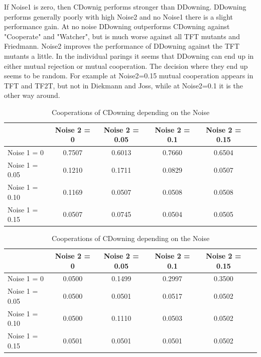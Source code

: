 If Noise1 is zero, then CDownig performs stronger than DDowning. DDowning performs generally poorly with high Noise2 and no Noise1 there is a slight performance gain. At no noise DDowning outperforms CDowning against "Cooperate" and "Watcher", but is much worse against all TFT mutants and Friedmann. Noise2 improves the performance of DDowning against the TFT mutants a little. In the individual parings it seems that DDowning can end up in either mutual rejection or mutual cooperation. The decision where they end up seems to be random. For example at Noise2=0.15 mutual cooperation appears in TFT and TF2T, but not in Diekmann and Joss, while at Noise2=0.1 it is the other way around.

\begin{table}[h]
 \begin{center}
\caption{Cooperations of CDowning depending on the Noise} \vspace{3mm}
\begin{tabular}{|l|c|c|c|c|c|}
\hline
   	& Noise 2 = 0 & Noise 2 = 0.05& Noise 2 = 0.1& Noise 2 = 0.15 \\
  \hline
  Noise 1 = 0 	&      0.7507  &  0.6013 &   0.7660 &  0.6504 \\
 \hline
  Noise 1 = 0.05	 &           0.1210  &  0.1711  &  0.0829 &  0.0507 \\
 \hline
  Noise 1 = 0.10 	&          0.1169   & 0.0507 &   0.0508  &  0.0508 \\
 \hline
  Noise 1 = 0.15 	&        0.0507  &  0.0745 &   0.0504 &  0.0505 \\
 \hline
\end{tabular}
 \end{center}
\end{table}

\begin{table}[h]
 \begin{center}
\caption{Cooperations of CDowning depending on the Noise} \vspace{3mm}
\begin{tabular}{|l|c|c|c|c|c|}
\hline
   	& Noise 2 = 0 & Noise 2 = 0.05& Noise 2 = 0.1& Noise 2 = 0.15 \\
  \hline
  Noise 1 = 0 	&        0.0500  &  0.1499&   0.2997  &  0.3500 \\
 \hline
  Noise 1 = 0.05	 &              0.0500   & 0.0501  &  0.0517  & 0.0502 \\
 \hline
  Noise 1 = 0.10 	&             0.0500 &   0.1110  &  0.0503  &  0.0502 \\
 \hline
  Noise 1 = 0.15 	&          0.0501  &  0.0501 &   0.0501  &  0.0502 \\
 \hline
\end{tabular}
 \end{center}
\end{table}

